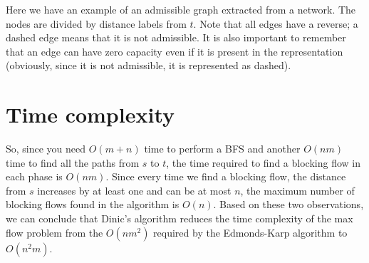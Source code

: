 \begin{center}

\end{center}
Here we have an example of an admissible graph extracted from a network.
The nodes are divided by distance labels from $t$.
Note that all edges have a reverse; a dashed edge means that it is not admissible. It is also important to remember that an edge can have zero capacity even if it is present in the representation (obviously, since it is not admissible, it is represented as dashed).

\section{Time complexity}

So, since you need $O(m + n)$ time to perform a BFS and another $O(nm)$ time to find all the paths from $s$ to $t$, the time required to find a blocking flow in each phase is $O(nm)$.
Since every time we find a blocking flow, the distance from $s$ increases by at least one and can be at most $n$, the maximum number of blocking flows found in the algorithm is $O(n)$.
Based on these two observations, we can conclude that Dinic's algorithm reduces the time complexity of the max flow problem from the $O(nm^2)$ required by the Edmonds-Karp algorithm to $O(n^2m)$.

\cleardoublepage

